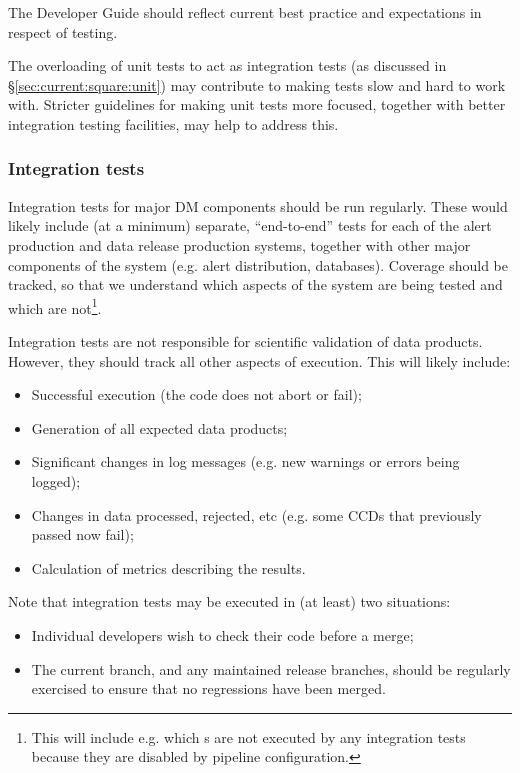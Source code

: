 \documentclass[DM,authoryear,toc,lsstdraft]{lsstdoc}
\begin{document}
The Developer Guide should reflect current best practice and expectations in
respect of testing.

The overloading of unit tests to act as integration tests (as discussed in
\S\ref{sec:current:square:unit}) may contribute to making tests slow and hard
to work with. Stricter guidelines for making unit tests more focused, together
with better integration testing facilities, may help to address this.

\subsubsection{Integration tests}

Integration tests for major DM components should be run regularly. These would
likely include (at a minimum) separate, ``end-to-end'' tests for each of the
alert production and data release production systems, together with other
major components of the system (e.g. alert distribution, databases). Coverage
should be tracked, so that we understand which aspects of the system are being
tested and which are not\footnote{This will include e.g. which s
are not executed by any integration tests because they are disabled by
pipeline configuration.}.

Integration tests are not responsible for scientific validation of data
products. However, they should track all other aspects of execution. This will
likely include:

\begin{itemize}

  \item{Successful execution (the code does not abort or fail);}
  \item{Generation of all expected data products;}
  \item{Significant changes in log messages (e.g. new warnings or errors being
  logged);}
  \item{Changes in data processed, rejected, etc (e.g. some CCDs that
  previously passed now fail);}
  \item{Calculation of metrics describing the results.}

\end{itemize}

Note that integration tests may be executed in (at least) two situations:

\begin{itemize}

  \item{Individual developers wish to check their code before a merge;}
  \item{The current  branch, and any maintained release branches,
  should be regularly exercised to ensure that no regressions have been
  merged.}

\end{itemize}
\end{document}
